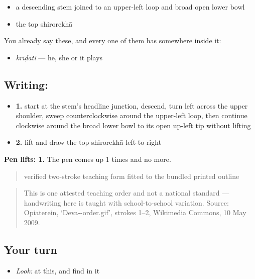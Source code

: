 \begin{itemize}
\raggedright
  \item a descending stem joined to an upper-left loop and broad open lower bowl
  \item the top shirorekhā
\end{itemize}

You already say these, and every one of them has  somewhere inside it:

\begin{itemize}
\raggedright
  \item \textbf{} \emph{krīḍati} — he, she or it plays
\end{itemize}

\subsection*{Writing: }

\begin{itemize}
\raggedright
  \item \textbf{1.} start at the stem's headline junction, descend, turn left across the upper shoulder, sweep counterclockwise around the upper-left loop, then continue clockwise around the broad lower bowl to its open up-left tip without lifting
  \item \textbf{2.} lift and draw the top shirorekhā left-to-right
\end{itemize}

\textbf{Pen lifts: 1.} The pen comes up 1 times and no more.

\begin{quote}
verified two-stroke teaching form fitted to the bundled printed outline
\end{quote}

\begin{quote}
This is one attested teaching order and not a national standard — handwriting here is taught with school-to-school variation. Source: Opiaterein, ‘Deva--order.gif’, strokes 1–2, Wikimedia Commons, 10 May 2009.
\end{quote}

\subsection*{Your turn}
\begin{itemize}
\raggedright
  \item \emph{Look:} at this, and find  in it
\end{itemize}

